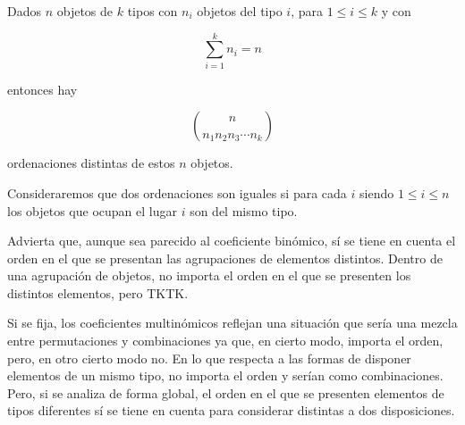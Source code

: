 \begin{theorem}
  Dados $n$ objetos de $k$ tipos con $n_i$ objetos del tipo $i$, para $1
  \leq i \leq k$ y con

  $$ \sum_{i=1}^k n_i = n $$

  \noindent entonces hay

  $$ {n \choose {{n_1} {n_2} {n_3} \cdots {n_k}}} $$

  \noindent ordenaciones distintas de estos $n$ objetos.

  Consideraremos que dos ordenaciones son iguales si para cada $i$ siendo $1
  \leq i \leq n$ los objetos que ocupan el lugar $i$ son del mismo tipo.
\end{theorem}

Advierta que, aunque sea parecido al coeficiente binómico, sí se tiene en
cuenta el orden en el que se presentan las agrupaciones de elementos
distintos. Dentro de una agrupación de objetos, no importa el orden en el
que se presenten los distintos elementos, pero TKTK.

Si se fija, los coeficientes multinómicos reflejan una situación que sería
una mezcla entre permutaciones y combinaciones ya que, en cierto modo,
importa el orden, pero, en otro cierto modo no. En lo que respecta a las
formas de disponer elementos de un mismo tipo, no importa el orden y serían
como combinaciones. Pero, si se analiza de forma global, el orden en el que
se presenten elementos de tipos diferentes sí se tiene en cuenta para
considerar distintas a dos disposiciones.


